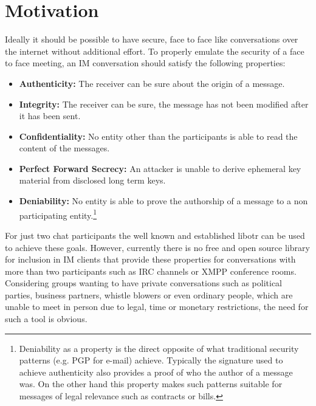 \section{Motivation}

Ideally it should be possible to have secure, face to face
like conversations over the internet without additional effort. To properly
emulate the security of a face to face meeting, an IM conversation should
satisfy the following properties:

\begin{itemize}

	\item{\textbf{Authenticity:} The receiver can be sure about the origin of a
		message.}

	\item{\textbf{Integrity:} The receiver can be sure, the message has not been
		modified after it has been sent.}

	\item{\textbf{Confidentiality:} No entity other than the participants is
		able to read the content of the messages.}

	\item{\textbf{Perfect Forward Secrecy:} An attacker is unable to derive
		ephemeral key material from disclosed long term keys.}

	\item{\textbf{Deniability:} No entity is able to prove the authorship of a
			message to a non participating entity.\footnote{Deniability as a
				property is the direct opposite of what traditional security
				patterns (e.g. PGP for e-mail) achieve. Typically the signature
		used to achieve authenticity also provides a proof of who the author of
a message was. On the other hand this property makes such patterns suitable for
messages of legal relevance such as contracts or bills.}}

\end{itemize}

For just two chat participants the well known and established libotr can be used
to achieve these goals. However, currently there is no free and open source
library for inclusion in IM clients that provide these properties for
conversations with more than two participants such as IRC channels or XMPP
conference rooms. Considering groups wanting to have private conversations such
as political parties, business partners, whistle blowers or even ordinary people, which are unable to
meet in person due to legal, time or monetary restrictions, the need for such a
tool is obvious.

